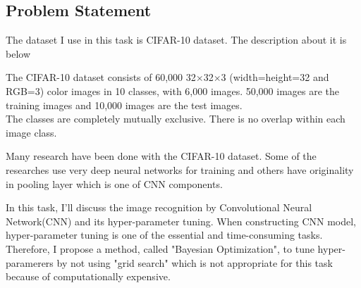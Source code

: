 \subsection{Problem Statement}


The dataset I use in this task is CIFAR-10 dataset. The description about it is below


The CIFAR-10 dataset consists of 60,000 32$\times$32$\times$3 (width=height=32 and RGB=3) color images in 10 classes, with 6,000 images. 50,000 images are the training images and 10,000 images are the test images.\\
The classes are completely mutually exclusive. There is no overlap within each image class.



Many research have been done with the CIFAR-10 dataset. Some of the researches use very deep neural networks for training\cite{Very deep} and others have originality in pooling layer which is one of CNN components.\cite{Fractional}



In this task, I'll discuss the image recognition by Convolutional Neural Network(CNN) and its hyper-parameter tuning. When constructing CNN model, hyper-parameter tuning is one of the essential and time-consuming tasks. Therefore, I propose a method, called "Bayesian Optimization", to tune hyper-paramerers by not using "grid search" which is not appropriate for this task because of computationally expensive.